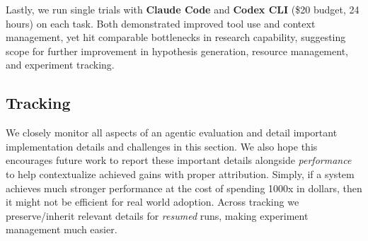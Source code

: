 \documentclass[11pt]{article}
\newcommand{\ms}[2]{\ensuremath{#1_\text{{\textcolor{gray}{±#2}}}}}
\newcommand{\kw}[1]{{\textsc{\MakeLowercase{#1}}}}
\newcommand{\cellgood}[1]{\cellcolor{green!8}#1}
\newcommand{\cellmiss}[1]{\cellcolor{gray!12}#1}
\theoremstyle{plain}
\theoremstyle{definition}
\theoremstyle{remark}
\begin{document}

Lastly, we run single trials with \textbf{Claude Code} and \textbf{Codex CLI} (\$20 budget, 24 hours) on each task. Both demonstrated improved tool use and context management, yet hit comparable bottlenecks in research capability, suggesting scope for further improvement in hypothesis generation, resource management, and experiment tracking.

\subsection{Tracking} \label{app:tracking}
We closely monitor all aspects of an agentic evaluation and detail important implementation details and challenges in this section. We also hope this encourages future work to report these important details alongside \emph{performance} to help contextualize achieved gains with proper attribution. Simply, if a system achieves much stronger performance at the cost of spending 1000x in dollars, then it might not be efficient for real world adoption. Across tracking we preserve/inherit relevant details for \emph{resumed} runs, making experiment management much easier. 
\end{document}
